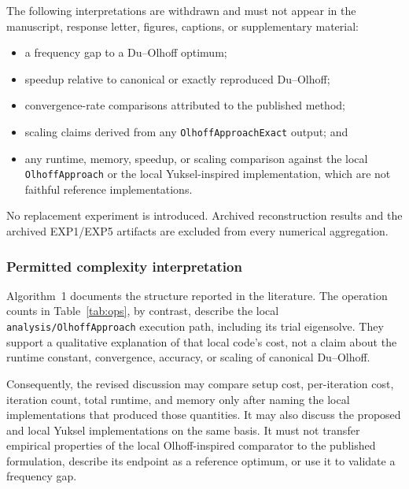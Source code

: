 \documentclass[12pt,a4paper]{article}
\begin{document}
The following interpretations are withdrawn and must not appear in the
manuscript, response letter, figures, captions, or supplementary material:
\begin{itemize}[leftmargin=1.6em]
  \item a frequency gap to a Du--Olhoff optimum;
  \item speedup relative to canonical or exactly reproduced Du--Olhoff;
  \item convergence-rate comparisons attributed to the published method;
  \item scaling claims derived from any \texttt{OlhoffApproachExact} output; and
  \item any runtime, memory, speedup, or scaling comparison against the local
        \texttt{OlhoffApproach} or the local Yuksel-inspired implementation,
        which are not faithful reference implementations.
\end{itemize}
No replacement experiment is introduced.  Archived reconstruction results and
the archived EXP1/EXP5 artifacts are excluded from every numerical aggregation.

\subsubsection*{Permitted complexity interpretation}

Algorithm~1 documents the structure reported in the literature.  The
operation counts in Table~\ref{tab:ops}, by contrast, describe the local
\texttt{analysis/OlhoffApproach} execution path, including its trial
eigensolve.  They support a qualitative explanation of that local code's
cost, not a claim about the runtime constant, convergence, accuracy, or
scaling of canonical Du--Olhoff.

Consequently, the revised discussion may compare setup cost,
per-iteration cost, iteration count, total runtime, and memory only after
naming the local implementations that produced those quantities.  It may
also discuss the proposed and local Yuksel implementations on the same
basis.  It must not transfer empirical properties of the local
Olhoff-inspired comparator to the published formulation, describe its
endpoint as a reference optimum, or use it to validate a frequency gap.



\end{document}

